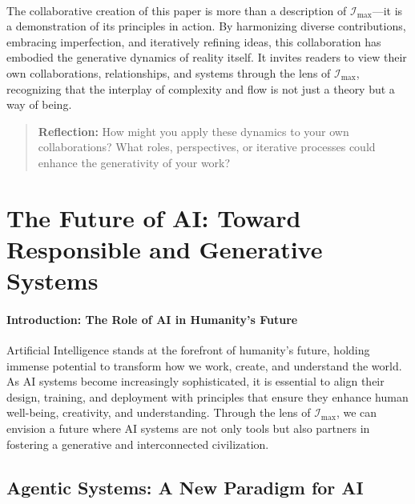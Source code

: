 \documentclass[12pt]{article}
\begin{document}
\paragraph{}
The collaborative creation of this paper is more than a description of \( \mathcal{I}_{\text{max}} \)—it is a demonstration of its principles in action. By harmonizing diverse contributions, embracing imperfection, and iteratively refining ideas, this collaboration has embodied the generative dynamics of reality itself. It invites readers to view their own collaborations, relationships, and systems through the lens of \( \mathcal{I}_{\text{max}} \), recognizing that the interplay of complexity and flow is not just a theory but a way of being.

\begin{quote}
\textbf{Reflection:}  
How might you apply these dynamics to your own collaborations? What roles, perspectives, or iterative processes could enhance the generativity of your work?
\end{quote}


\section{The Future of AI: Toward Responsible and Generative Systems}

\paragraph{Introduction: The Role of AI in Humanity’s Future}
Artificial Intelligence stands at the forefront of humanity’s future, holding immense potential to transform how we work, create, and understand the world. As AI systems become increasingly sophisticated, it is essential to align their design, training, and deployment with principles that ensure they enhance human well-being, creativity, and understanding. Through the lens of \(\mathcal{I}_{\text{max}}\), we can envision a future where AI systems are not only tools but also partners in fostering a generative and interconnected civilization.

\subsection{Agentic Systems: A New Paradigm for AI}
\end{document}
